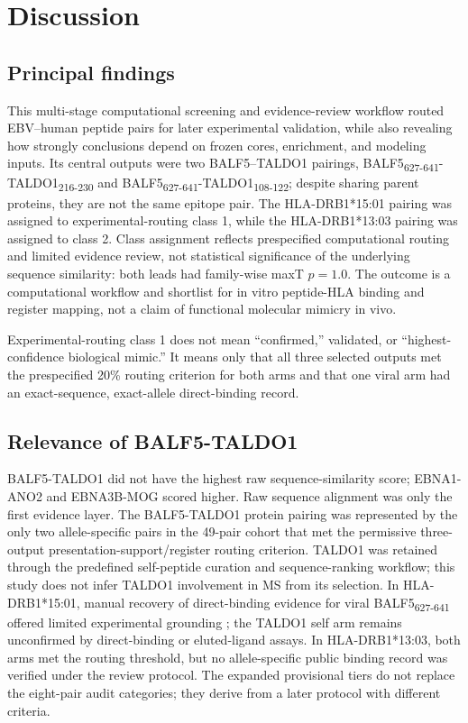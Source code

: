 \documentclass[11pt]{article}
\newcommand{\pep}[2]{#1\textsubscript{#2}}
\begin{document}
\section{Discussion}
\subsection{Principal findings}
This multi-stage computational screening and evidence-review workflow routed EBV--human peptide pairs for later experimental validation, while also revealing how strongly conclusions depend on frozen cores, enrichment, and modeling inputs. Its central outputs were two BALF5--TALDO1 pairings, \pep{BALF5}{627-641}-\pep{TALDO1}{216-230} and \pep{BALF5}{627-641}-\pep{TALDO1}{108-122}; despite sharing parent proteins, they are not the same epitope pair. The HLA-DRB1*15:01 pairing was assigned to experimental-routing class 1, while the HLA-DRB1*13:03 pairing was assigned to class 2. Class assignment reflects prespecified computational routing and limited evidence review, not statistical significance of the underlying sequence similarity: both leads had family-wise maxT $p=1.0$. The outcome is a computational workflow and shortlist for in vitro peptide-HLA binding and register mapping, not a claim of functional molecular mimicry in vivo.

Experimental-routing class 1 does not mean ``confirmed,'' validated, or ``highest-confidence biological mimic.'' It means only that all three selected outputs met the prespecified 20\% routing criterion for both arms and that one viral arm had an exact-sequence, exact-allele direct-binding record.

\subsection{Relevance of BALF5-TALDO1}
BALF5-TALDO1 did not have the highest raw sequence-similarity score; EBNA1-ANO2 and EBNA3B-MOG scored higher. Raw sequence alignment was only the first evidence layer. The BALF5-TALDO1 protein pairing was represented by the only two allele-specific pairs in the 49-pair cohort that met the permissive three-output presentation-support/register routing criterion. TALDO1 was retained through the predefined self-peptide curation and sequence-ranking workflow; this study does not infer TALDO1 involvement in MS from its selection. In HLA-DRB1*15:01, manual recovery of direct-binding evidence for viral \pep{BALF5}{627-641} offered limited experimental grounding \cite{iedb,hansen}; the TALDO1 self arm remains unconfirmed by direct-binding or eluted-ligand assays. In HLA-DRB1*13:03, both arms met the routing threshold, but no allele-specific public binding record was verified under the review protocol. The expanded provisional tiers do not replace the eight-pair audit categories; they derive from a later protocol with different criteria.
\end{document}
